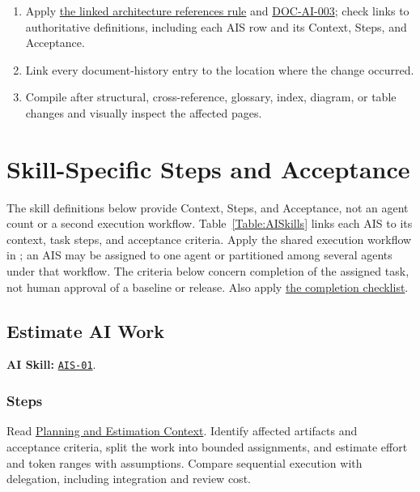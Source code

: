 \begin{enumerate}
name of the LaTeX file containing its \verb|| command. The including
chapter shall place it in a
numbered figure, add a descriptive caption and stable label, and reference the
figure in its text. Apply the connector-routing and label-clearance rule \hyperref[Requirement:DOCTIKZ002]{DOC-TIKZ-002}.
\item Apply \hyperref[Rule:AIReferenceLinks]{the linked architecture references rule}
and \hyperref[Requirement:DOCAI003]{DOC-AI-003}; check links to authoritative
definitions, including each AIS row and its Context, Steps, and Acceptance.
\item Link every document-history entry to the location where the change
occurred.
\item Compile after structural, cross-reference, glossary, index, diagram, or
table changes and visually inspect the affected pages.
\end{enumerate}

\section{Skill-Specific Steps and Acceptance}
\label{Section:AIArchitectureWorkflow}
The skill definitions below provide Context, Steps, and Acceptance, not an agent count or a second
execution workflow. Table~\ref{Table:AISkills} links each AIS to its
context, task steps, and acceptance criteria. Apply the shared execution workflow in
; an AIS may be assigned to one agent or
partitioned among several agents under that workflow. The criteria below
concern completion of the assigned task, not human approval of a baseline or
release. Also apply \hyperref[Table:AICompletionChecklist]{the completion checklist}.

\subsection{Estimate AI Work}
\label{Section:AIEstimateSteps}
\noindent\textbf{AI Skill:} \hyperref[Skill:AIS-01]{\texttt{AIS-01}}.

\subsubsection*{Steps}
\label{Section:AIEstimateTaskSteps}
Read \hyperref[Section:AIPlanningEstimateContext]{Planning and Estimation Context}. Identify affected artifacts and acceptance criteria, split the work into bounded assignments, and estimate effort and token ranges with assumptions. Compare sequential execution with delegation, including integration and review cost.

